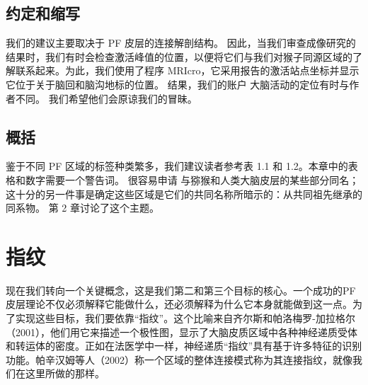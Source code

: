 \subsection{约定和缩写}
我们的建议主要取决于 PF 皮层的连接解剖结构。 因此，当我们审查成像研究的结果时，我们有时会检查激活峰值的位置，以便将它们与我们对猴子同源区域的了解联系起来。为此，我们使用了程序 MRIcro，它采用报告的激活站点坐标并显示它位于关于脑回和脑沟地标的位置。 结果，我们的账户
大脑活动的定位有时与作者不同。 我们希望他们会原谅我们的冒昧。
\subsection{概括}
鉴于不同 PF 区域的标签种类繁多，我们建议读者参考表 1.1 和 1.2。本章中的表格和数字需要一个警告词。 很容易申请
与猕猴和人类大脑皮层的某些部分同名； 这十分的另一件事是确定这些区域是它们的共同名称所暗示的：从共同祖先继承的同系物。 第 2 章讨论了这个主题。
\par
\par






\section{指纹}
现在我们转向一个关键概念，这是我们第二和第三个目标的核心。一个成功的PF皮层理论不仅必须解释它能做什么，还必须解释为什么它本身就能做到这一点。为了实现这些目标，我们要依靠“指纹”。这个比喻来自齐尔斯和帕洛梅罗-加拉格尔（2001），他们用它来描述一个极性图，显示了大脑皮质区域中各种神经递质受体和转运体的密度。正如在法医学中一样，神经递质“指纹”具有基于许多特征的识别功能。帕辛汉姆等人（2002）称一个区域的整体连接模式称为其连接指纹，就像我们在这里所做的那样。
